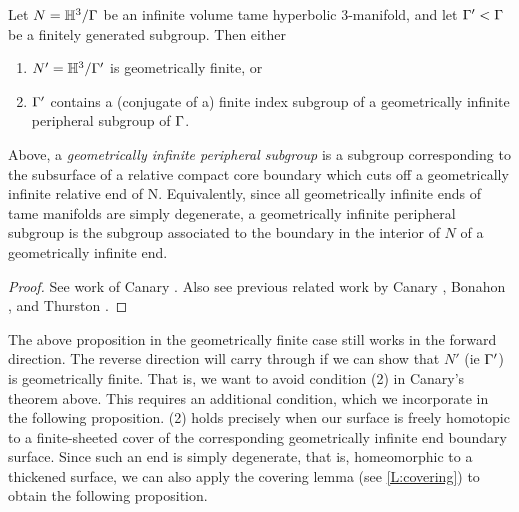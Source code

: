 \begin{thm}

Let $N = \mathbb{H}^3/\Gamma$ be an infinite volume tame hyperbolic $3$-manifold, and let
$\Gamma' < \Gamma$ be a finitely generated subgroup. Then either

\begin{enumerate}

\item $N' = \mathbb{H}^3 / \Gamma'$ is geometrically finite, or

\item $\Gamma'$ contains a (conjugate of a) finite index subgroup of
a geometrically infinite peripheral subgroup of $\Gamma$.

\end{enumerate}

Above, a \emph{geometrically infinite peripheral subgroup} is a subgroup
corresponding to the subsurface of a relative compact core boundary which cuts
off a geometrically infinite relative end of N. Equivalently, since all
geometrically infinite ends of tame manifolds are simply degenerate,
a geometrically infinite peripheral subgroup is the subgroup associated to the
boundary in the interior of $N$ of a geometrically infinite end.

\end{thm}

\begin{proof}

See work of Canary \cite{Canary}. Also see previous related work by Canary
\cite{Canary2}, Bonahon \cite{Bonahon}, and Thurston \cite{Thurstonnotes}.

\end{proof}

The above proposition in the geometrically finite case still works in the
forward direction. The reverse direction will carry through if we can show that
$N'$ (ie $\Gamma'$) is geometrically finite. That is, we want to avoid condition
(2) in Canary's theorem above. This requires an additional condition, which we
incorporate in the following proposition. (2) holds precisely when our surface
is freely homotopic to a finite-sheeted cover of the corresponding
geometrically infinite end boundary surface. Since such an end is simply
degenerate, that is, homeomorphic to a thickened surface, we can also apply the
covering lemma (see \ref{L:covering}) to obtain the following proposition.

